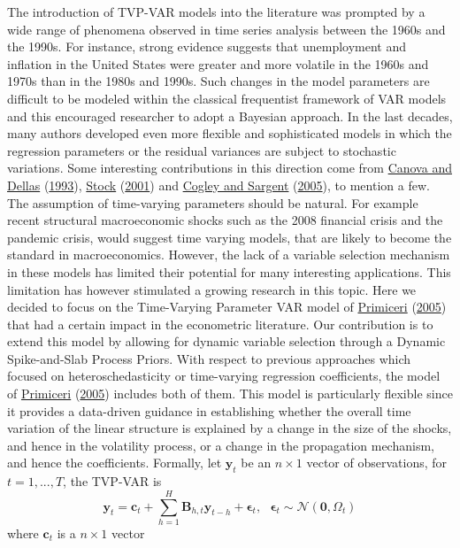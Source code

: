 \documentclass[
  12pt,
]{book}
\theoremstyle{break}
\theoremstyle{nonumberplain}
\begin{document}
The introduction of TVP-VAR models into the literature was prompted by a
wide range of phenomena observed in time series analysis between the
1960s and the 1990s. For instance, strong evidence suggests that
unemployment and inflation in the United States were greater and more
volatile in the 1960s and 1970s than in the 1980s and 1990s. Such
changes in the model parameters are difficult to be modeled within the
classical frequentist framework of VAR models and this encouraged
researcher to adopt a Bayesian approach. In the last decades, many
authors developed even more flexible and sophisticated models in which
the regression parameters or the residual variances are subject to
stochastic variations. Some interesting contributions in this direction
come from \protect\hyperlink{ref-CANOVA_1993}{Canova and Dellas}
(\protect\hyperlink{ref-CANOVA_1993}{1993}),
\protect\hyperlink{ref-CS_2001}{Stock}
(\protect\hyperlink{ref-CS_2001}{2001}) and
\protect\hyperlink{ref-COGLEY2005262}{Cogley and Sargent}
(\protect\hyperlink{ref-COGLEY2005262}{2005}), to mention a few.\\
The assumption of time-varying parameters should be natural. For example
recent structural macroeconomic shocks such as the 2008 financial crisis
and the pandemic crisis, would suggest time varying models, that are
likely to become the standard in macroeconomics. However, the lack of a
variable selection mechanism in these models has limited their potential
for many interesting applications. This limitation has however
stimulated a growing research in this topic. Here we decided to focus on
the Time-Varying Parameter VAR model of
\protect\hyperlink{ref-Primicieri_2005}{Primiceri}
(\protect\hyperlink{ref-Primicieri_2005}{2005}) that had a certain
impact in the econometric literature. Our contribution is to extend this
model by allowing for dynamic variable selection through a Dynamic
Spike-and-Slab Process Priors. With respect to previous approaches which
focused on heteroschedasticity or time-varying regression coefficients,
the model of \protect\hyperlink{ref-Primicieri_2005}{Primiceri}
(\protect\hyperlink{ref-Primicieri_2005}{2005}) includes both of them.
This model is particularly flexible since it provides a data-driven
guidance in establishing whether the overall time variation of the
linear structure is explained by a change in the size of the shocks, and
hence in the volatility process, or a change in the propagation
mechanism, and hence the coefficients. Formally, let
\(\boldsymbol{y}_{t}\) be an \(n \times 1\) vector of observations, for
\(t=1,...,T\), the TVP-VAR is \begin{equation}\label{eq:TVPVAR1}
\boldsymbol{y}_{t}=\boldsymbol{c}_{t}+\sum_{h=1}^{H}\boldsymbol{B}_{h,t}\boldsymbol{y}_{t-h}+\boldsymbol{\epsilon}_{t}, \ \ \ \boldsymbol{\epsilon}_{t}\sim\mathcal{N}(\boldsymbol{0},\Omega_{t})
\end{equation} where \(\boldsymbol{c}_{t}\) is a \(n \times 1\) vector
\end{document}
